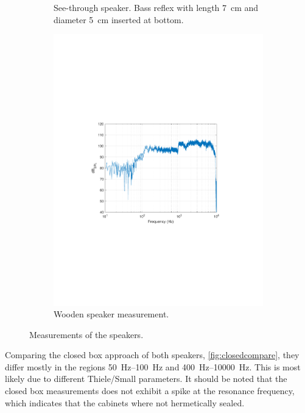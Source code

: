 \begin{figure}
\begin{subfigure}[t]{.5\textwidth}
		\caption{See-through speaker. Bass reflex with length \SI{7}{\centi\metre} and diameter \SI{5}{\centi\metre} inserted at bottom.}
		\label{fig:measPGbass}
	\end{subfigure}%
	\begin{subfigure}[t]{.5\textwidth}
		\centering
		\includegraphics[width=.9\linewidth, clip, trim={3.9cm 8.4cm 4.5cm 9cm}]{gfx/SpeakerMeas/PKclosed.pdf}
		\caption{Wooden speaker measurement.}
		\label{fig:measPK}
	\end{subfigure}
	\caption{Measurements of the speakers.}
	\label{fig:measAll}
\end{figure}

Comparing the closed box approach of both speakers, \cref{fig:closedcompare}, they differ mostly in the regions \SIrange{50}{100}{\hertz} and \SIrange{400}{10000}{\hertz}.
This is most likely due to different Thiele/Small parameters.
It should be noted that the closed box measurements does not exhibit a spike at the resonance frequency, which indicates that the cabinets where not hermetically sealed.

